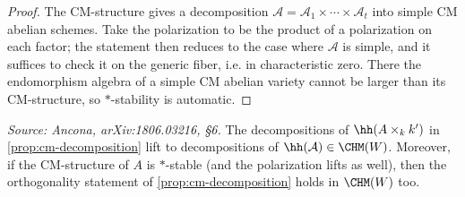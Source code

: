 \begin{proof}
  The CM-structure gives a decomposition
  \(\mathcal{A} = \mathcal{A}_1 \times \cdots \times \mathcal{A}_t\) into simple
  CM abelian schemes. Take the polarization to be the product of a polarization
  on each factor; the statement then reduces to the case where \(\mathcal{A}\) is
  simple, and it suffices to check it on the generic fiber, i.e. in
  characteristic zero. There the endomorphism algebra of a simple CM abelian
  variety cannot be larger than its CM-structure, so \(*\)-stability is
  automatic.
\end{proof}

\begin{corollary}
  \label{cor:lifting-motives}
  \textit{Source: Ancona, arXiv:1806.03216, §6.}
  The decompositions of \(\hh(A \times_k k')\) in \cref{prop:cm-decomposition}
  lift to decompositions of \(\hh(\mathcal{A}) \in \CHM(W)\). Moreover, if the
  CM-structure of \(A\) is \(*\)-stable (and the polarization lifts as well),
  then the orthogonality statement of \cref{prop:cm-decomposition} holds in
  \(\CHM(W)\) too.
\end{corollary}

